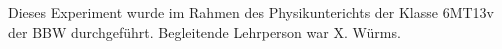 Dieses Experiment wurde im Rahmen des Physikunterichts der Klasse 6MT13v der BBW durchgeführt. Begleitende Lehrperson war X. Würms.